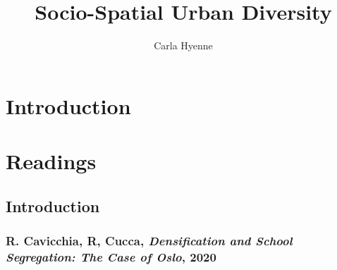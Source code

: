 \documentclass{article}
\title{Socio-Spatial Urban Diversity}
\author{Carla Hyenne}
\begin{document}
\maketitle

\tableofcontents

\pagebreak

\section{Introduction}

\subsection{}

\section{}

\section{}

\section{}

\section{Readings}

\subsection{Introduction}

\subsubsection{R. Cavicchia, R, Cucca, \textit{Densification and School Segregation: The Case of Oslo}, 2020}
\end{document}
